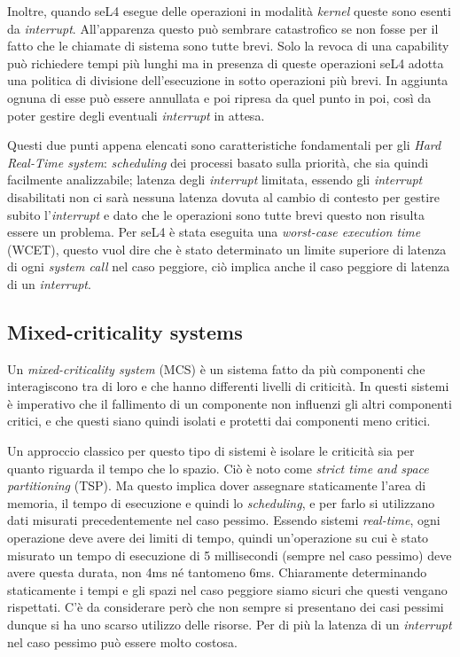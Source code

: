 Inoltre, quando seL4 esegue delle operazioni in modalità \textit{kernel} queste sono esenti da \textit{interrupt}. All'apparenza questo può sembrare catastrofico se non fosse per il fatto che le chiamate di sistema sono tutte brevi. Solo la revoca di una capability può richiedere tempi più lunghi ma in presenza di queste operazioni seL4 adotta una politica di divisione dell'esecuzione in sotto operazioni più brevi. In aggiunta ognuna di esse può essere annullata e poi ripresa da quel punto in poi, così da poter gestire degli eventuali \textit{interrupt} in attesa.

Questi due punti appena elencati sono caratteristiche fondamentali per gli \textit{Hard Real-Time system}: \textit{scheduling} dei processi basato sulla priorità, che sia quindi facilmente analizzabile; latenza degli \textit{interrupt} limitata, essendo gli \textit{interrupt} disabilitati non ci sarà nessuna latenza dovuta al cambio di contesto per gestire subito l'\textit{interrupt} e dato che le operazioni sono tutte brevi questo non risulta essere un problema.
Per seL4 è stata eseguita una \textit{worst-case execution time} (WCET), questo vuol dire che è stato determinato un limite superiore di latenza di ogni \textit{system call} nel caso peggiore, ciò implica anche il caso peggiore di latenza di un \textit{interrupt}.

\subsection{Mixed-criticality systems}
Un \textit{mixed-criticality system} (MCS) è un sistema fatto da più componenti che interagiscono tra di loro e che hanno differenti livelli di criticità. In questi sistemi è imperativo che il fallimento di un componente non influenzi gli altri componenti critici, e che questi siano quindi isolati e protetti dai componenti meno critici.

Un approccio classico per questo tipo di sistemi è isolare le criticità sia per quanto riguarda il tempo che lo spazio. Ciò è noto come \textit{strict time and space partitioning} (TSP). Ma questo implica dover assegnare staticamente l'area di memoria, il tempo di esecuzione e quindi lo \textit{scheduling}, e per farlo si utilizzano dati misurati precedentemente nel caso pessimo. Essendo sistemi \textit{real-time}, ogni operazione deve avere dei limiti di tempo, quindi un'operazione su cui è stato misurato un tempo di esecuzione di 5 millisecondi (sempre nel caso pessimo) deve avere questa durata, non 4ms né tantomeno 6ms. Chiaramente determinando staticamente i tempi e gli spazi nel caso peggiore siamo sicuri che questi vengano rispettati. C'è da considerare però che non sempre si presentano dei casi pessimi dunque si ha uno scarso utilizzo delle risorse. Per di più la latenza di un \textit{interrupt} nel caso pessimo può essere molto costosa.

